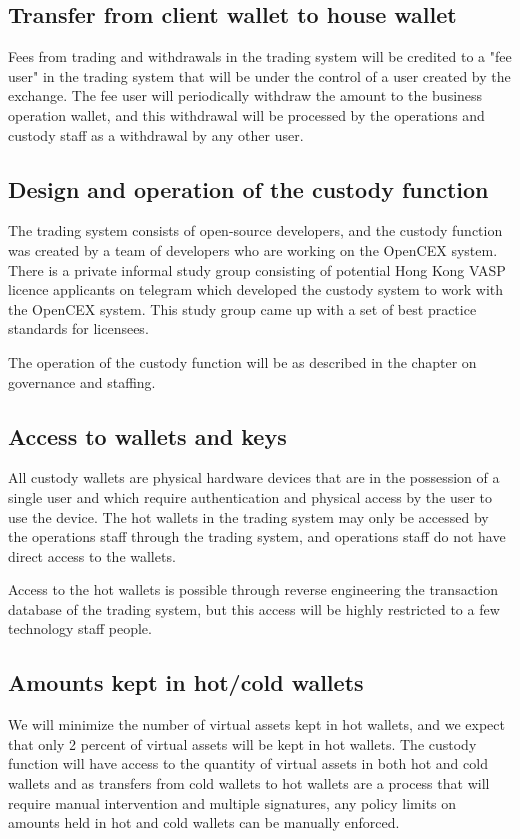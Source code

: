 \subsection{Transfer from client wallet to house wallet}
Fees from trading and withdrawals in the trading system will be
credited to a "fee user" in the trading system that will be under
the control of a user created by the exchange.  The fee user will
periodically withdraw the amount to the business operation wallet,
and this withdrawal will be processed by the operations and custody
staff as a withdrawal by any other user.

\subsection{Design and operation of the custody function}

The trading system consists of open-source developers, and the custody
function was created by a team of developers who are working on the
OpenCEX system.  There is a private informal study group consisting of
potential Hong Kong VASP licence applicants on telegram which
developed the custody system to work with the OpenCEX system. This
study group came up with a set of best practice standards for
licensees.

The operation of the custody function will be as described in the
chapter on governance and staffing.

\subsection{Access to wallets and keys}

All custody wallets are physical hardware devices that are in the
possession of a single user and which require authentication and
physical access by the user to use the device.  The hot wallets
in the trading system may only be accessed by the operations staff
through the trading system, and operations staff do not have direct
access to the wallets.

Access to the hot wallets is possible through reverse engineering the
transaction database of the trading system, but this access will be
highly restricted to a few technology staff people.

\subsection{Amounts kept in hot/cold wallets}
We will minimize the number of virtual assets kept in hot wallets, and
we expect that only 2 percent of virtual assets will be kept in hot
wallets.  The custody function will have access to the quantity of
virtual assets in both hot and cold wallets and as transfers from cold
wallets to hot wallets are a process that will require manual
intervention and multiple signatures, any policy limits on amounts
held in hot and cold wallets can be manually enforced.


